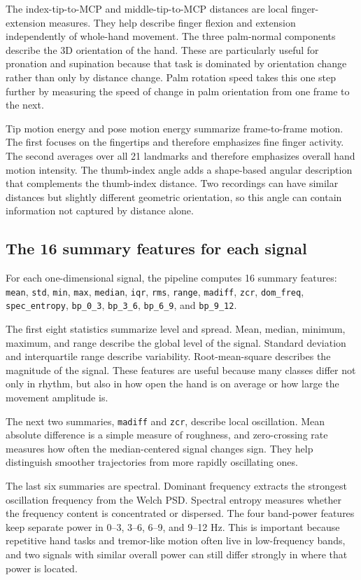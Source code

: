\documentclass[10pt,twocolumn]{article}
\begin{document}
The index-tip-to-MCP and middle-tip-to-MCP distances are local finger-extension measures. They help describe finger flexion and extension independently of whole-hand movement. The three palm-normal components describe the 3D orientation of the hand. These are particularly useful for pronation and supination because that task is dominated by orientation change rather than only by distance change. Palm rotation speed takes this one step further by measuring the speed of change in palm orientation from one frame to the next.

Tip motion energy and pose motion energy summarize frame-to-frame motion. The first focuses on the fingertips and therefore emphasizes fine finger activity. The second averages over all 21 landmarks and therefore emphasizes overall hand motion intensity. The thumb-index angle adds a shape-based angular description that complements the thumb-index distance. Two recordings can have similar distances but slightly different geometric orientation, so this angle can contain information not captured by distance alone.

\subsection{The 16 summary features for each signal}
For each one-dimensional signal, the pipeline computes 16 summary features: \texttt{mean}, \texttt{std}, \texttt{min}, \texttt{max}, \texttt{median}, \texttt{iqr}, \texttt{rms}, \texttt{range}, \texttt{madiff}, \texttt{zcr}, \texttt{dom\_freq}, \texttt{spec\_entropy}, \texttt{bp\_0\_3}, \texttt{bp\_3\_6}, \texttt{bp\_6\_9}, and \texttt{bp\_9\_12}.

The first eight statistics summarize level and spread. Mean, median, minimum, maximum, and range describe the global level of the signal. Standard deviation and interquartile range describe variability. Root-mean-square describes the magnitude of the signal. These features are useful because many classes differ not only in rhythm, but also in how open the hand is on average or how large the movement amplitude is.

The next two summaries, \texttt{madiff} and \texttt{zcr}, describe local oscillation. Mean absolute difference is a simple measure of roughness, and zero-crossing rate measures how often the median-centered signal changes sign. They help distinguish smoother trajectories from more rapidly oscillating ones.

The last six summaries are spectral. Dominant frequency extracts the strongest oscillation frequency from the Welch PSD. Spectral entropy measures whether the frequency content is concentrated or dispersed. The four band-power features keep separate power in 0--3, 3--6, 6--9, and 9--12 Hz. This is important because repetitive hand tasks and tremor-like motion often live in low-frequency bands, and two signals with similar overall power can still differ strongly in where that power is located.
\end{document}
